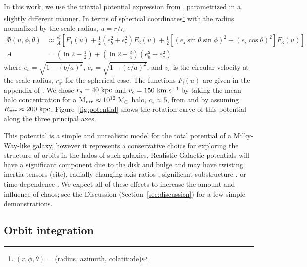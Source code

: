 \documentclass[letterpaper,12pt,preprint]{aastex}
\newcommand{\msun}{\ensuremath{\mathrm{M}_\odot}}
\begin{document}
In this work, we use the triaxial potential expression from \citet{leesuto03}, parametrized in a slightly different manner. In terms of spherical coordinates\footnote{$(r,\phi,\theta)$ = (radius, azimuth, colatitude)} with the radius normalized by the scale radius, $u = r/r_s$
\begin{align}
	\Phi(u,\phi,\theta) &\approx \frac{v_c^2}{A}\left[F_1(u) + \frac{1}{2}(e_b^2 + e_c^2)F_2(u) + \frac{1}{2} [(e_b\sin\theta \sin\phi)^2 + (e_c\cos\theta)^2] F_3(u) \right]\\
	A &= \left(\ln2 - \frac{1}{2}\right) + \left(\ln2-\frac{3}{4}\right) (e_b^2 + e_c^2)
\end{align}
where $e_b = \sqrt{1 - (b/a)^2}$, $e_c = \sqrt{1 - (c/a)^2}$, and $v_c$ is the circular velocity at the scale radius, $r_s$, for the spherical case. The functions $F_i(u)$ are given in the appendix of \cite{leesuto03}. We chose $r_s=40~{\rm kpc}$ and $v_c = 150~{\rm km}~{\rm s}^{-1}$ by taking the mean halo concentration for a ${\rm M}_{vir} \approx 10^{12}~\msun$ halo, $c_e\approx5$, from \cite{jing02} and by assuming $R_{vir}\approx200~{\rm kpc}$. Figure~\ref{fig:potential} shows the rotation curve of this potential along the three principal axes.


This potential is a simple and unrealistic model for the total potential of a Milky-Way-like galaxy, however it represents a conservative choice for exploring the structure of orbits in the halos of such galaxies. Realistic Galactic potentials will have a significant component due to the disk and bulge and may have twisting inertia tensors (cite), radially changing axis ratios \citep[e.g.,][]{kazantzidis04,debattista08,veraciro11}, significant substructure \citep{moore98,zemp09}, or time dependence \citep[either from bulk rotation, mass growth, mergers, etc.][]{bailin05}. We expect all of these effects to increase the amount and influence of chaos; see the Discussion (Section~\ref{sec:discussion}) for a few simple demonstrations.

\subsection{Orbit integration}\label{sec:integration}
\end{document}

